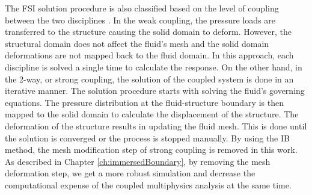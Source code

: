 The FSI solution procedure is also classified based on the level of coupling between the two disciplines \cite{hu2001direct}. In the weak coupling, the pressure loads are transferred to the structure causing the solid domain to deform. However, the structural domain does not affect the fluid's mesh and the solid domain deformations are not mapped back to the fluid domain. In this approach, each discipline is solved a single time to calculate the response. On the other hand, in the 2-way, or strong coupling, the solution of the coupled system is done in an iterative manner. The solution procedure starts with solving the fluid's governing equations. The pressure distribution at the fluid-structure boundary is then mapped to the solid domain to calculate the displacement of the structure. The deformation of the structure results in updating the fluid mesh. This is done until the solution is converged or the process is stopped manually. By using the IB method, the mesh modification step of strong coupling is removed in this work. As described in Chapter \ref{ch:immersedBoundary}, by removing the mesh deformation step, we get a more robust simulation and decrease the computational expense of the coupled multiphysics analysis at the same time.
